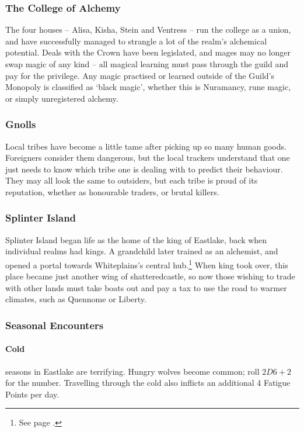 \begin{multicols}{2}
\subsubsection{The College of Alchemy}

The four houses -- Alisa, Kisha, Stein and Ventress -- run the college as a union, and have successfully managed to strangle a lot of the realm's alchemical potential.
Deals with the Crown have been legislated, and mages may no longer swap magic of any kind -- all magical learning must pass through the guild and pay for the privilege.
Any magic practised or learned outside of the Guild's Monopoly is classified as `black magic', whether this is Nuramancy, rune magic, or simply unregistered alchemy.

\subsubsection{Gnolls}

Local tribes have become a little tame after picking up so many human goods.
Foreigners consider them dangerous, but the local trackers understand that one just needs to know which tribe one is dealing with to predict their behaviour.
They may all look the same to outsiders, but each tribe is proud of its reputation, whether as honourable traders, or brutal killers.

\subsubsection{Splinter Island}

Splinter Island began life as the home of the king of Eastlake, back when individual realms had kings.
A grandchild later trained as an alchemist, and opened a portal towards Whiteplains's central hub.\footnote{See page \pageref{whiteland_heart}.}
When \gls{king} took over, this place became just another wing of \gls{shatteredcastle}, so now those wishing to trade with other lands must take boats out and pay a tax to use the road to warmer climates, such as Quennome or Liberty.

\subsubsection{Seasonal Encounters}

\paragraph{Cold} seasons in Eastlake are terrifying.
Hungry wolves become common; roll $2D6 + 2$ for the number.
Travelling through the cold also inflicts an additional 4 Fatigue Points per day.

\end{multicols}
